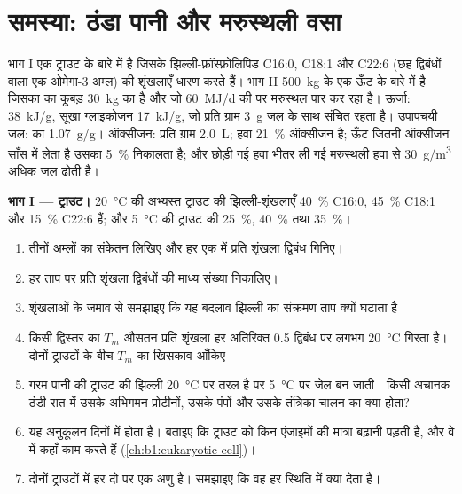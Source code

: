 \section{समस्या: ठंडा पानी और मरुस्थली वसा}

\begin{problem}
\label{pb:b1:lipids:1}
भाग I एक ट्राउट के बारे में है जिसके झिल्ली-फ़ॉस्फ़ोलिपिड C16:0, C18:1
और C22:6 (छह द्विबंधों वाला एक ओमेगा-3 अम्ल) की शृंखलाएँ धारण करते हैं।
भाग II \qty{500}{kg} के एक ऊँट के बारे में है जिसका
 का कूबड़ \qty{30}{kg} का है और जो
\qty{60}{MJ/d} की  पर मरुस्थल पार कर रहा है। ऊर्जा: 
\qty{38}{kJ/g}, सूखा ग्लाइकोजन \qty{17}{kJ/g}, जो प्रति ग्राम
\qty{3}{g} जल के साथ संचित रहता है। उपापचयी जल:  का
\qty{1.07}{g/g}। ऑक्सीजन: प्रति ग्राम  \qty{2.0}{L}; हवा
\qty{21}{\%} ऑक्सीजन है; ऊँट जितनी ऑक्सीजन साँस में लेता है उसका
\qty{5}{\%} निकालता है; और छोड़ी गई हवा भीतर ली गई मरुस्थली हवा से
\qty{30}{g/m^3} अधिक जल ढोती है।

\medskip
\noindent\textbf{भाग I --- ट्राउट।}
\qty{20}{\celsius} की अभ्यस्त ट्राउट की झिल्ली-शृंखलाएँ
\qty{40}{\%} C16:0, \qty{45}{\%} C18:1 और \qty{15}{\%} C22:6 हैं; और
\qty{5}{\celsius} की ट्राउट की \qty{25}{\%}, \qty{40}{\%} तथा \qty{35}{\%}।
\begin{enumerate}
  \item तीनों अम्लों का संकेतन लिखिए और हर एक में प्रति शृंखला द्विबंध
        गिनिए।
  \item हर ताप पर प्रति शृंखला द्विबंधों की माध्य संख्या निकालिए।
  \item शृंखलाओं के जमाव से समझाइए कि यह बदलाव झिल्ली का संक्रमण ताप
        क्यों घटाता है।
  \item किसी द्विस्तर का $T_m$ औसतन प्रति शृंखला हर अतिरिक्त
        \qty{0.5}{} द्विबंध पर लगभग \qty{20}{\celsius} गिरता है। दोनों
        ट्राउटों के बीच $T_m$ का खिसकाव आँकिए।
  \item गरम पानी की ट्राउट की झिल्ली \qty{20}{\celsius} पर तरल है पर
        \qty{5}{\celsius} पर जेल बन जाती। किसी अचानक ठंडी रात में उसके
        अभिगमन प्रोटीनों, उसके पंपों और उसके तंत्रिका-चालन का क्या होता?
  \item यह अनुकूलन दिनों में होता है। बताइए कि ट्राउट को किन एंजाइमों की
        मात्रा बढ़ानी पड़ती है, और वे  में कहाँ काम करते हैं (\cref{ch:b1:eukaryotic-cell})।
  \item दोनों ट्राउटों में  हर दो  पर एक अणु
        है। समझाइए कि वह हर स्थिति में क्या देता है।
\end{enumerate}


\end{problem}
